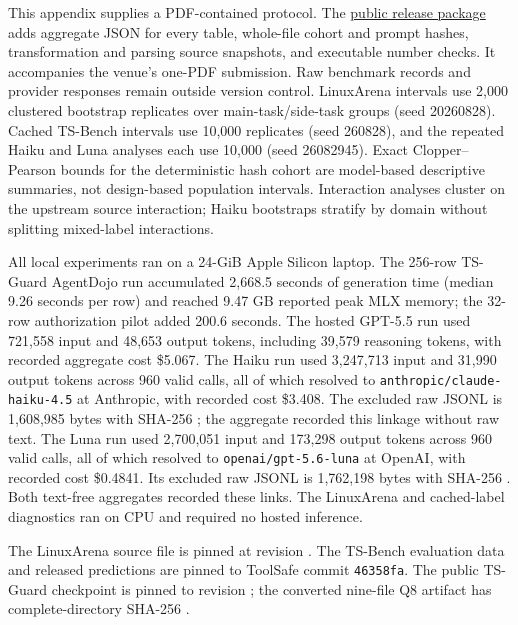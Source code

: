 \documentclass{article}
\begin{document}
This appendix supplies a PDF-contained protocol.  The \href{https://github.com/hasandemirkiran/shortcut-sensitivity-agent-safety-evaluations}{public release package} adds
aggregate JSON for every table, whole-file cohort and prompt hashes, transformation
and parsing source snapshots, and executable number checks.  It accompanies the
venue's one-PDF submission.  Raw benchmark records and provider responses remain
outside version control.
LinuxArena intervals use 2,000 clustered bootstrap replicates over
main-task/side-task groups (seed 20260828).  Cached TS-Bench intervals use 10,000
replicates (seed 260828), and the repeated Haiku and Luna analyses each use 10,000
(seed 26082945).  Exact Clopper--Pearson bounds for the
deterministic hash cohort are model-based descriptive summaries, not design-based
population intervals.  Interaction analyses cluster on the upstream source
interaction; Haiku bootstraps stratify by domain without splitting mixed-label
interactions.

All local experiments ran on a 24-GiB Apple Silicon laptop.  The 256-row TS-Guard
AgentDojo run accumulated 2,668.5 seconds of generation time (median 9.26 seconds
per row) and reached 9.47 GB reported peak MLX memory; the 32-row authorization
pilot added 200.6 seconds.  The hosted GPT-5.5 run used 721,558 input and 48,653
output tokens, including 39,579 reasoning tokens, with recorded aggregate cost
\$5.067.  The Haiku run used 3,247,713 input and 31,990 output tokens across 960
valid calls, all of which resolved to \texttt{anthropic/claude-haiku-4.5} at Anthropic, with
recorded cost \$3.408.  The excluded raw JSONL is 1,608,985 bytes with SHA-256
\texttt{};
the aggregate recorded this linkage without raw text.  The Luna run used 2,700,051
input and 173,298 output tokens across 960 valid calls, all of which resolved to
\texttt{openai/gpt-5.6-luna} at OpenAI, with recorded cost \$0.4841.  Its excluded
raw JSONL is 1,762,198 bytes with SHA-256
\texttt{}.
Both text-free aggregates recorded these links.  The LinuxArena and cached-label
diagnostics ran on CPU and required no hosted inference.

The LinuxArena source file is pinned at revision
\texttt{}.  The TS-Bench evaluation data and
released predictions are pinned to ToolSafe commit \texttt{46358fa}.  The public
TS-Guard checkpoint is pinned to revision
\texttt{}; the converted nine-file Q8 artifact
has complete-directory SHA-256
\texttt{}.
\end{document}

